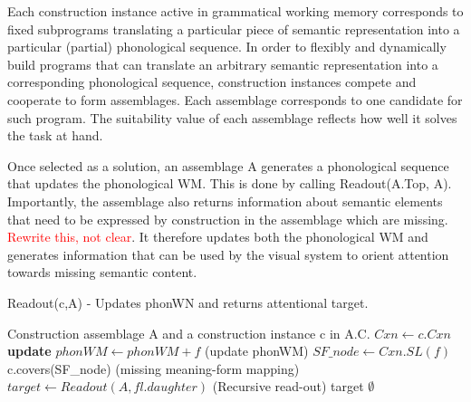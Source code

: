 \documentclass{article}
\newcommand\todo[1]{\textcolor{red}{#1}}
\begin{document}
Each construction instance active in grammatical working memory corresponds to fixed subprograms translating a particular piece of semantic representation into a particular (partial) phonological sequence. In order to flexibly and dynamically build programs that can translate an arbitrary semantic representation into a corresponding phonological sequence, construction instances compete and cooperate to form assemblages. Each assemblage corresponds to one candidate for such program. The suitability value of each assemblage reflects how well it solves the task at hand.

Once selected as a solution, an assemblage A generates a phonological sequence that updates the phonological WM. This is done by calling Readout(A.Top, A). Importantly, the assemblage also returns information about semantic elements that need to be expressed by construction in the assemblage which are missing. \todo{Rewrite this, not clear}. It therefore updates both the phonological WM and generates information that can be used by the visual system to orient attention towards missing semantic content.

\begin{algorithm}[H]
\caption{Readout(c,A) - Updates phonWN and returns attentional target.}
\label{readout}
\begin{algorithmic}
	\REQUIRE Construction assemblage A and a construction instance c in A.C.
	\STATE $Cxn \leftarrow c.Cxn$
			\STATE \textbf{update} $phonWM \leftarrow phonWM + f$ (update phonWM)
				\STATE $SF\_node \leftarrow Cxn.SL(f)$
				\RETURN c.covers(SF\_node) (missing meaning-form mapping)
				\STATE $target \leftarrow Readout(A,fl.daughter)$ (Recursive read-out)
					\RETURN target
				\ENDIF
			\ENDIF
		\ENDIF
	\ENDFOR
	\RETURN $\emptyset$
\end{algorithmic}
\end{algorithm}
\end{document}
